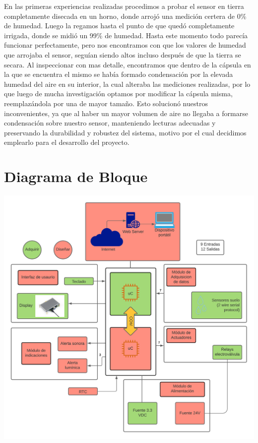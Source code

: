 \documentclass{article}
\begin{document}
En las primeras experiencias realizadas procedimos a probar el sensor en tierra completamente disecada en un horno, donde arrojó una medición certera de 0\% de humedad. Luego la regamos hasta el punto de que quedó completamente irrigada, donde se midió un 99\% de humedad. Hasta este momento todo parecía funcionar perfectamente, pero nos encontramos con que los valores de humedad que arrojaba el sensor, seguían siendo altos incluso después de que la tierra se secara. Al inspeccionar con mas detalle, encontramos que dentro de la cápsula en la que se encuentra el mismo se había formado condensación por la elevada humedad del aire en su interior, la cual alteraba las mediciones realizadas, por lo que luego de mucha investigación optamos por modificar la cápsula misma, reemplazándola por una de mayor tamaño. Esto solucionó nuestros inconvenientes, ya que al haber un mayor volumen de aire no llegaba a formarse condensación sobre nuestro sensor, manteniendo lecturas adecuadas y preservando la durabilidad y robustez del sistema, motivo por el cual decidimos emplearlo para el desarrollo del proyecto.

\section{Diagrama de Bloque}

\centering
\includegraphics[width=\linewidth]{Imagenes/DIAGRAMA.png} \par



\end{document}
